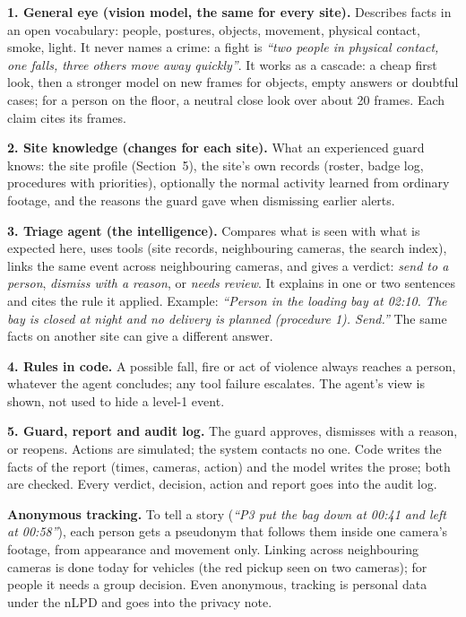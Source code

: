 \documentclass[11pt,a4paper]{article}
\begin{document}
\textbf{1. General eye (vision model, the same for every site).} Describes facts in an open vocabulary: people,
postures, objects, movement, physical contact, smoke, light. It never names a crime: a fight is \emph{``two people
in physical contact, one falls, three others move away quickly''}. It works as a cascade: a cheap first look, then
a stronger model on new frames for objects, empty answers or doubtful cases; for a person on the floor, a neutral
close look over about 20 frames. Each claim cites its frames.

\textbf{2. Site knowledge (changes for each site).} What an experienced guard knows: the site profile
(Section~5), the site's own records (roster, badge log, procedures with priorities), optionally the normal activity
learned from ordinary footage, and the reasons the guard gave when dismissing earlier alerts.

\textbf{3. Triage agent (the intelligence).} Compares what is seen with what is expected here, uses tools
(site records, neighbouring cameras, the search index), links the same event across neighbouring cameras, and
gives a verdict: \emph{send to a person}, \emph{dismiss with a reason}, or \emph{needs review}. It explains in one
or two sentences and cites the rule it applied. Example: \emph{``Person in the loading bay at 02:10. The bay is
closed at night and no delivery is planned (procedure 1). Send.''} The same facts on another site can give a
different answer.

\textbf{4. Rules in code.} A possible fall, fire or act of violence always reaches a person, whatever the agent
concludes; any tool failure escalates. The agent's view is shown, not used to hide a level-1 event.

\textbf{5. Guard, report and audit log.} The guard approves, dismisses with a reason, or reopens. Actions are
simulated; the system contacts no one. Code writes the facts of the report (times, cameras, action) and the model
writes the prose; both are checked. Every verdict, decision, action and report goes into the audit log.

\textbf{Anonymous tracking.} To tell a story (\emph{``P3 put the bag down at 00:41 and left at 00:58''}), each
person gets a pseudonym that follows them inside one camera's footage, from appearance and movement only. Linking
across neighbouring cameras is done today for vehicles (the red pickup seen on two cameras); for people it needs a
group decision. Even anonymous, tracking is personal data under the nLPD and goes into the privacy note.
\end{document}
